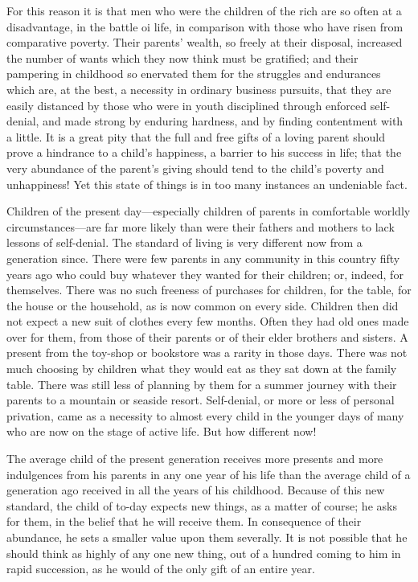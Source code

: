 \documentclass[
]{book}
\begin{document}
For this reason it is that men who were the children of the rich are so often at a disadvantage, in the battle oi life, in comparison with those who have risen from comparative poverty. Their parents' wealth, so freely at their disposal, increased the number of wants which they now think must be gratified; and their pampering in childhood so enervated them for the struggles and endurances which are, at the best, a necessity in ordinary business pursuits, that they are easily distanced by those who were in youth disciplined through enforced self-denial, and made strong by enduring hardness, and by finding contentment with a little. It is a great pity that the full and free gifts of a loving parent should prove a hindrance to a child's happiness, a barrier to his success in life; that the very abundance of the parent's giving should tend to the child's poverty and unhappiness! Yet this state of things is in too many instances an undeniable fact.

Children of the present day---especially children of parents in comfortable worldly circumstances---are far more likely than were their fathers and mothers to lack lessons of self-denial. The standard of living is very different now from a generation since. There were few parents in any community in this country fifty years ago who could buy whatever they wanted for their children; or, indeed, for themselves. There was no such freeness of purchases for children, for the table, for the house or the household, as is now common on every side. Children then did not expect a new suit of clothes every few months. Often they had old ones made over for them, from those of their parents or of their elder brothers and sisters. A present from the toy-shop or bookstore was a rarity in those days. There was not much choosing by children what they would eat as they sat down at the family table. There was still less of planning by them for a summer journey with their parents to a mountain or seaside resort. Self-denial, or more or less of personal privation, came as a necessity to almost every child in the younger days of many who are now on the stage of active life. But how different now!

The average child of the present generation receives more presents and more indulgences from his parents in any one year of his life than the average child of a generation ago received in all the years of his childhood. Because of this new standard, the child of to-day expects new things, as a matter of course; he asks for them, in the belief that he will receive them. In consequence of their abundance, he sets a smaller value upon them severally. It is not possible that he should think as highly of any one new thing, out of a hundred coming to him in rapid succession, as he would of the only gift of an entire year.
\end{document}
